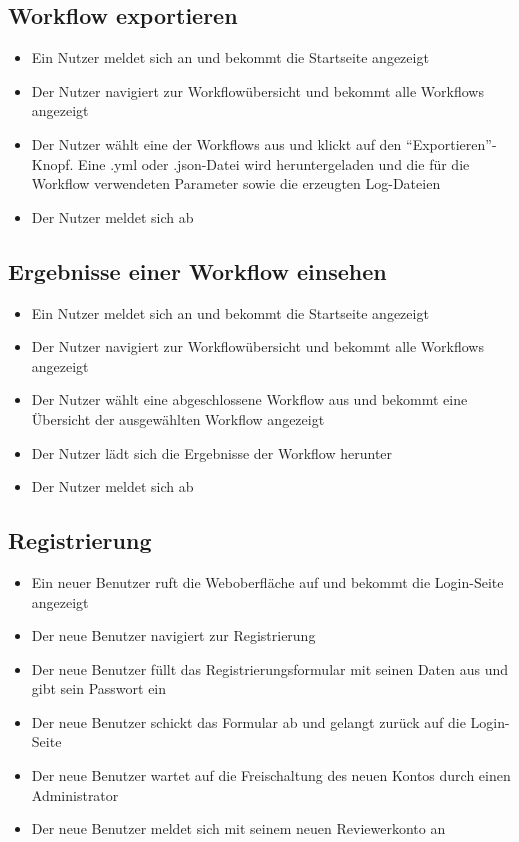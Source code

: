 \subsection*{\gls{Workflow} exportieren}
\begin{itemize}
    \item Ein \gls{Nutzer} meldet sich an und bekommt die Startseite angezeigt
    \item Der \gls{Nutzer} navigiert zur Workflowübersicht und bekommt alle Workflows angezeigt
    \item Der \gls{Nutzer} wählt eine der \glspl{Workflow} aus und klickt auf den \enquote{Exportieren}-Knopf. Eine .yml oder .json-Datei wird heruntergeladen und die für die \gls{Workflow} verwendeten Parameter sowie die erzeugten Log-Dateien
    \item Der \gls{Nutzer} meldet sich ab
\end{itemize}

\subsection*{Ergebnisse einer \gls{Workflow} einsehen}
\begin{itemize}
    \item Ein \gls{Nutzer} meldet sich an und bekommt die Startseite angezeigt
    \item Der \gls{Nutzer} navigiert zur Workflowübersicht und bekommt alle Workflows angezeigt
    \item Der \gls{Nutzer} wählt eine abgeschlossene \gls{Workflow} aus und bekommt eine Übersicht der ausgewählten \gls{Workflow} angezeigt
    \item Der \gls{Nutzer} lädt sich die Ergebnisse der \gls{Workflow} herunter
    \item Der \gls{Nutzer} meldet sich ab
\end{itemize}


 \newpage
\subsection*{Registrierung}
\begin{itemize}
    \item Ein neuer Benutzer ruft die Weboberfläche auf und bekommt die Login-Seite angezeigt
    \item Der neue Benutzer navigiert zur Registrierung
    \item Der neue Benutzer füllt das Registrierungsformular mit seinen Daten aus und gibt sein Passwort ein
    \item Der neue Benutzer schickt das Formular ab und gelangt zurück auf die Login-Seite
    \item Der neue Benutzer wartet auf die Freischaltung des neuen Kontos durch einen Administrator
    \item Der neue Benutzer meldet sich mit seinem neuen \Gls{Reviewer}konto an %
\end{itemize}

